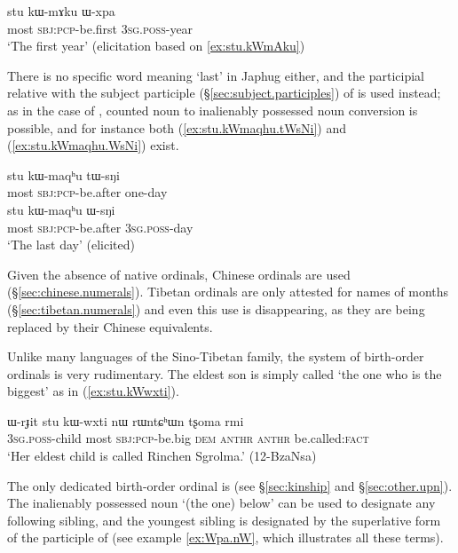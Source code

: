 \begin{exe}
\ex  \label{ex:stu.kWmAku.Wxpa}
\gll  stu kɯ-mɤku ɯ-xpa \\
 most \textsc{sbj}:\textsc{pcp}-be.first \textsc{3sg}.\textsc{poss}-year  \\
\glt  `The first year' (elicitation based on \ref{ex:stu.kWmAku})
\end{exe}

There is no specific word meaning `last' in Japhug either, and the participial relative   with the subject participle (§\ref{sec:subject.participles}) of  is used instead; as in the case of , counted noun to inalienably possessed noun conversion is possible, and for instance both (\ref{ex:stu.kWmaqhu.tWsNi}) and (\ref{ex:stu.kWmaqhu.WsNi}) exist.

\begin{exe}
\ex \label{ex:stu.kWmaqhu.tWsNi}
\gll  stu kɯ-maqʰu tɯ-sŋi  \\
 most \textsc{sbj}:\textsc{pcp}-be.after one-day \\
 \ex \label{ex:stu.kWmaqhu.WsNi}
\gll  stu kɯ-maqʰu ɯ-sŋi  \\
 most \textsc{sbj}:\textsc{pcp}-be.after \textsc{3sg}.\textsc{poss}-day \\
\glt `The last day' (elicited)
\end{exe}

Given the absence of native ordinals,  Chinese ordinals are used  (§\ref{sec:chinese.numerals}). Tibetan ordinals are only attested for names of months (§\ref{sec:tibetan.numerals}) and even this use is disappearing, as they are being replaced by their Chinese equivalents.

Unlike many languages of the Sino-Tibetan family, the system of birth-order ordinals is very rudimentary. The eldest son is simply called  `the one who is the biggest' as in (\ref{ex:stu.kWwxti}).

\begin{exe}
\ex  \label{ex:stu.kWwxti}
\gll ɯ-rɟit stu kɯ-wxti nɯ rɯntɕʰɯn tʂoma rmi\\
\textsc{3sg}.\textsc{poss}-child most \textsc{sbj}:\textsc{pcp}-be.big \textsc{dem}  \textsc{anthr} \textsc{anthr} be.called:\textsc{fact}\\
\glt `Her eldest child is called Rinchen Sgrolma.' (12-BzaNsa)
\end{exe}

The only dedicated birth-order ordinal is  (see §\ref{sec:kinship} and §\ref{sec:other.upn}). The inalienably possessed noun  `(the one) below' can be used to designate any following sibling, and the youngest sibling is designated by the superlative form of the participle of  (see example \ref{ex:Wpa.nW}, which illustrates all these terms).

